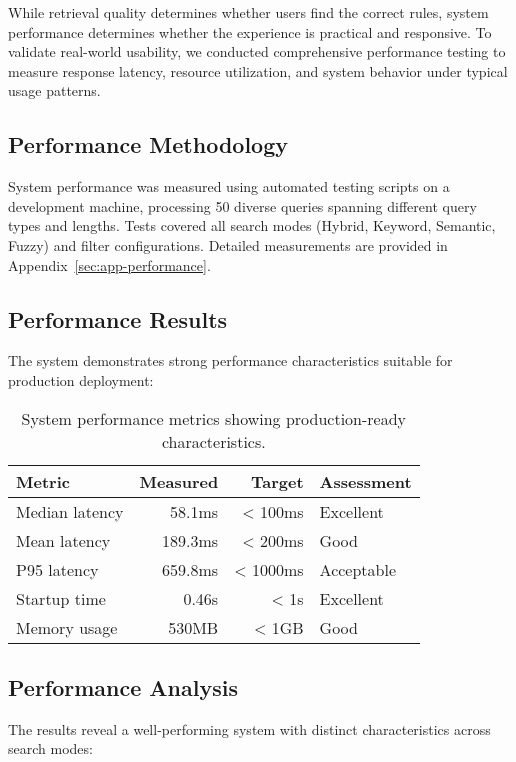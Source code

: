 While retrieval quality determines whether users find the correct rules, system performance determines whether the experience is practical and responsive. To validate real-world usability, we conducted comprehensive performance testing to measure response latency, resource utilization, and system behavior under typical usage patterns.

\subsection{Performance Methodology}

System performance was measured using automated testing scripts on a development machine, processing 50 diverse queries spanning different query types and lengths. Tests covered all search modes (Hybrid, Keyword, Semantic, Fuzzy) and filter configurations. Detailed measurements are provided in Appendix~\ref{sec:app-performance}.

\subsection{Performance Results}

The system demonstrates strong performance characteristics suitable for production deployment:

\begin{table}[!htbp]
\centering
\begin{tabular}{lrrl}
\toprule
\textbf{Metric} & \textbf{Measured} & \textbf{Target} & \textbf{Assessment} \\
\midrule
Median latency & 58.1ms & < 100ms & Excellent \\
Mean latency & 189.3ms & < 200ms & Good \\
P95 latency & 659.8ms & < 1000ms & Acceptable \\
Startup time & 0.46s & < 1s & Excellent \\
Memory usage & 530MB & < 1GB & Good \\
\bottomrule
\end{tabular}
\caption{System performance metrics showing production-ready characteristics.}
\label{tab:performance-results}
\end{table}

\subsection{Performance Analysis}

The results reveal a well-performing system with distinct characteristics across search modes:

